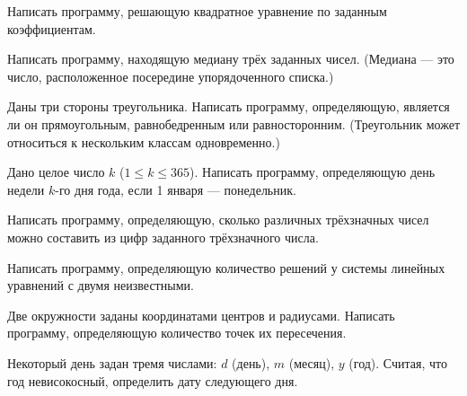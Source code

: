 \task Написать программу, решающую квадратное уравнение по заданным
коэффициентам.

\task Написать программу, находящую медиану трёх заданных
чисел. (Медиана — это число, расположенное посередине упорядоченного
списка.)

\task Даны три стороны треугольника. Написать программу, определяющую,
является ли он прямоугольным, равнобедренным или
равносторонним. (Треугольник может относиться к нескольким классам
одновременно.)

\task Дано целое число $k$ ($1 \leqslant k \leqslant 365$). Написать
программу, определяющую день недели $k$-го дня года, если 1 января —
понедельник.

\task Написать программу, определяющую, сколько различных трёхзначных
чисел можно составить из цифр заданного трёхзначного числа.

\task Написать программу, определяющую количество решений у системы
линейных уравнений с двумя неизвестными.

\task Две окружности заданы координатами центров и радиусами. Написать
программу, определяющую количество точек их пересечения.

\task Некоторый день задан тремя числами: $d$ (день), $m$ (месяц), $y$
(год). Считая, что год невисокосный, определить дату следующего дня.

